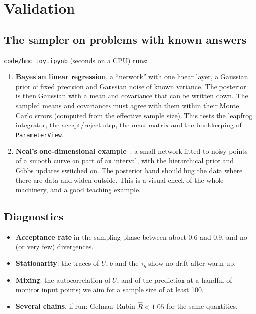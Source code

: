 \documentclass[11pt]{article}
\newcommand{\file}[1]{\nolinkurl{#1}}
\newcommand{\code}[1]{\texttt{#1}}
\begin{document}

\section{Validation}
\label{sec:validation}

\subsection{The sampler on problems with known answers}

\file{code/hmc_toy.ipynb} (seconds on a CPU) runs:
\begin{enumerate}
  \item \textbf{Bayesian linear regression}, a ``network'' with one linear layer, a
    Gaussian prior of fixed precision and Gaussian noise of known variance. The posterior
    is then Gaussian with a mean and covariance that can be written down. The sampled
    means and covariances must agree with them within their Monte Carlo errors
    (computed from the effective sample size). This tests the leapfrog integrator, the
    accept/reject step, the mass matrix and the bookkeeping of \code{ParameterView}.
  \item \textbf{Neal's one-dimensional example}~\cite{neal1996}: a small network fitted
    to noisy points of a smooth curve on part of an interval, with the hierarchical
    prior and Gibbs updates switched on. The posterior band should hug the data where
    there are data and widen outside. This is a visual check of the whole machinery,
    and a good teaching example.
\end{enumerate}

\subsection{Diagnostics}
\label{sec:diagnostics}

\begin{itemize}
  \item \textbf{Acceptance rate} in the sampling phase between about 0.6 and 0.9, and
    no (or very few) divergences.
  \item \textbf{Stationarity}: the traces of $U$, $b$ and the $\tau_g$ show no drift
    after warm-up.
  \item \textbf{Mixing}: the autocorrelation of $U$, and of the prediction at a handful
    of monitor input points; we aim for a sample size of at least 100.
  \item \textbf{Several chains}, if run: Gelman--Rubin $\hat R < 1.05$ for the same
    quantities.
\end{itemize}
\end{document}

